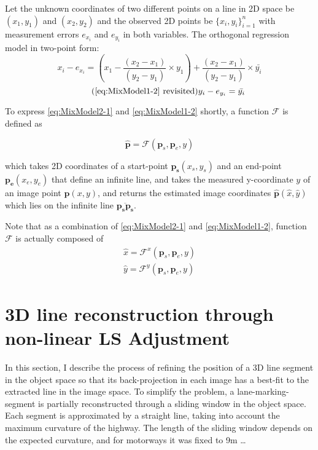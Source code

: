 Let the unknown coordinates of two different points on a line in 2D space be $(x_1,y_1)$ and $(x_2,y_2)$ and the observed 2D points be $\{x_i,y_i\}^n_{i=1}$ with measurement errors $e_{x_i}$ and $e_{y_i}$ in both variables. The orthogonal regression model in two-point form: 
\begin{equation} \label{eq:MixModel2-1}
x_i - e_{x_i}= (x_1-\dfrac{(x_2-x_1)}{(y_2-y_1)}\times y_1) + \dfrac{(x_2-x_1)}{(y_2-y_1)}\times \bar{y_i}
\end{equation}
\begin{equation} \tag{\ref{eq:MixModel1-2} revisited}
y_i-e_{y_i} = \bar{y_i}
\end{equation}

To express \eqref{eq:MixModel2-1} and \eqref{eq:MixModel1-2} shortly, a function $\mathcal{F}$ is defined as

\begin{equation} \label{eq:Ffunction}
\hat{\mathbf{p}} = \mathcal{F}(\mathbf{p}_s,\mathbf{p}_e,y)
\end{equation}

which takes 2D coordinates of a start-point $\mathbf{p_s}(x_s,y_s)$ and an end-point $\mathbf{p_e}(x_e,y_e)$ that define an infinite line, and takes the measured y-coordinate $y$ of an image point $\mathbf{p}(x,y)$, and returns the estimated image coordinates $\mathbf{\hat{p}}(\hat{x},\hat{y})$ which lies on the infinite line $\overline{\mathbf{p_s}\mathbf{p_s}}$.

Note that as a combination of \eqref{eq:MixModel2-1} and \eqref{eq:MixModel1-2}, function $\mathcal{F}$ is actually composed of
\begin{equation} \label{eq:Ffunction_xy}
\begin{split}
\hat{x} = \mathcal{F}^x(\mathbf{p}_s,\mathbf{p}_e,y)\\
\hat{y} = \mathcal{F}^y(\mathbf{p}_s,\mathbf{p}_e,y)
\end{split}
\end{equation}


\section{3D line reconstruction through non-linear LS Adjustment}
\label{sec:LSadj}

In this section, I describe the process of refining the position of a 3D line segment in the object space so that its back-projection in each image has a best-fit to the extracted line in the image space. To simplify the problem, a lane-marking-segment is partially reconstructed through a sliding window in the object space. Each segment is approximated by a straight line, taking into account the maximum curvature of the highway. 
The length of the sliding window depends on the expected curvature, and for motorways it was fixed to 9m …

